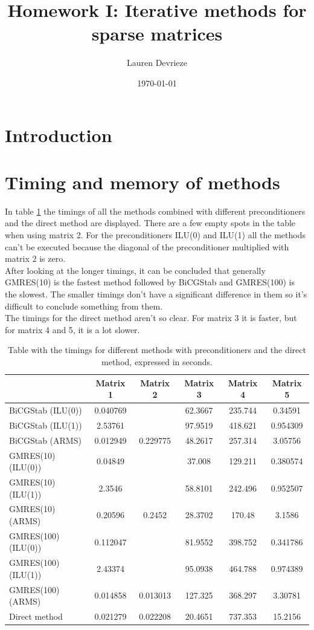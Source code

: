 \documentclass{article}
\title{Homework I: Iterative methods for sparse matrices}
\author{Lauren Devrieze}
\date{\today}
\begin{document}
	
	\maketitle
	
	\section*{Introduction}
	
	\section{Timing and memory of methods}
		
	In table \ref{tableTimings} the timings of all the methods combined with different preconditioners and the direct method are displayed. There are a few empty spots in the table when using matrix 2. For the preconditioners ILU(0) and ILU(1) all the methods can't be executed because the diagonal of the preconditioner multiplied with matrix 2 is zero.\\
	After looking at the longer timings, it can be concluded that generally GMRES(10) is the fastest method followed by BiCGStab and GMRES(100) is the slowest. The smaller timings don't have a significant difference in them so it's difficult to conclude something from them. \\
	The timings for the direct method aren't so clear. For matrix 3 it is faster, but for matrix 4 and 5, it is a lot slower.
	
	\begin{table}[h]
		\centering
		\begin{tabular}{|l|c|c|c|c|c|}
			\hline
							 & Matrix 1 & Matrix 2 & Matrix 3 & Matrix 4 & Matrix 5 \\\hline \hline 
			BiCGStab (ILU(0)) & 0.040769 & 		& 62.3667 & 235.744 & 0.34591 \\ \hline
			BiCGStab (ILU(1)) & 2.53761 & 	     & 97.9519 & 418.621 & 0.954309 \\ \hline
			BiCGStab (ARMS)  & 0.012949 & 0.229775 & 48.2617 & 257.314 & 3.05756 \\ \hline \hline
			GMRES(10) (ILU(0)) &  0.04849 & 	 & 37.008 & 129.211 & 0.380574  \\ \hline
			GMRES(10) (ILU(1)) & 2.3546 & 	    & 58.8101 & 242.496 & 0.952507 \\ \hline
			GMRES(10) (ARMS) & 0.20596 & 0.2452 & 28.3702 & 170.48 & 3.1586 \\ \hline \hline
			GMRES(100) (ILU(0)) & 0.112047 &    & 81.9552 & 398.752 & 0.341786 \\ \hline
			GMRES(100) (ILU(1)) & 2.43374 &     & 95.0938 & 464.788 & 0.974389 \\ \hline
			GMRES(100) (ARMS) & 0.014858 & 0.013013 & 127.325 & 368.297 & 3.30781 \\ \hline \hline
			Direct method & 0.021279 & 0.022208 & 20.4651 & 737.353  & 15.2156 \\ \hline
		\end{tabular}
		\caption{Table with the timings for different methods with preconditioners and the direct method, expressed in seconds.}
		\label{tableTimings}
	\end{table}
	
\end{document}
